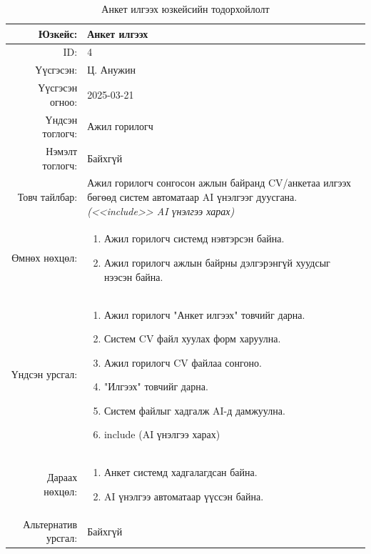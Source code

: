 \begin{longtable}{|r|p{11.5cm}|}
    \caption{Анкет илгээх юзкейсийн тодорхойлолт}
    \label{table:usecase4}\\ \hline
    {Юзкейс:} & {Анкет илгээх}\\ \hline
    {ID:} & {4}\\ \hline
    {Үүсгэсэн:} & {Ц. Анужин}\\ \hline
    {Үүсгэсэн огноо:} & {2025-03-21}\\ \hline
    {Үндсэн тоглогч:} & {Ажил горилогч}\\ \hline
    {Нэмэлт тоглогч:} & {Байхгүй}\\ \hline
    {Товч тайлбар:} & {Ажил горилогч сонгосон ажлын байранд CV/анкетаа илгээх бөгөөд систем автоматаар AI үнэлгээг дуусгана. \textit{(<<include>> AI үнэлгээ харах)}}\\ \hline
    {Өмнөх нөхцөл:} & {\begin{enumerate}[nosep]
        \item Ажил горилогч системд нэвтэрсэн байна.
        \item Ажил горилогч ажлын байрны дэлгэрэнгүй хуудсыг нээсэн байна.
    \end{enumerate}}\\ \hline
    {Үндсэн урсгал:} & {\begin{enumerate}[nosep]
        \item Ажил горилогч "Анкет илгээх" товчийг дарна.
        \item Систем CV файл хуулах форм харуулна.
        \item Ажил горилогч CV файлаа сонгоно.
        \item "Илгээх" товчийг дарна.
        \item Систем файлыг хадгалж AI-д дамжуулна.
        \item include (AI үнэлгээ харах)
    \end{enumerate}}\\ \hline
    {Дараах нөхцөл:} & {\begin{enumerate}[nosep]
        \item Анкет системд хадгалагдсан байна.
        \item AI үнэлгээ автоматаар үүссэн байна.
    \end{enumerate}}\\ \hline
    {Альтернатив урсгал:} & {Байхгүй}\\ \hline
\end{longtable}

